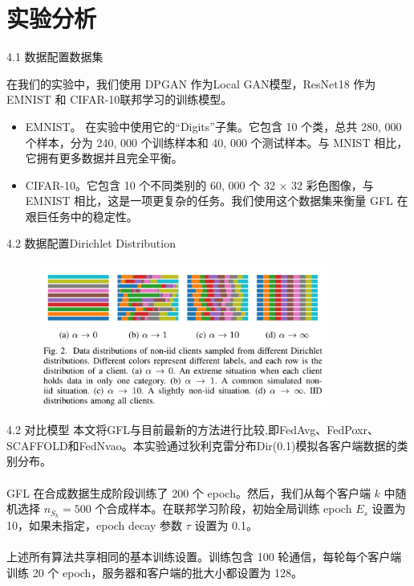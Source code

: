 \documentclass{sintefbeamer}
\theoremstyle{definition}
\begin{document}
\section{实验分析}

\begin{frame}{4.1 数据配置}{数据集}

在我们的实验中，我们使用 DPGAN 作为Local GAN模型，ResNet18 作为 EMNIST 和 CIFAR-10联邦学习的训练模型。

	\begin{itemize}
\item[1)] EMNIST。 在实验中使用它的“Digits”子集。它包含 10 个类，总共 280, 000 个样本，分为 240, 000 个训练样本和 40, 000 个测试样本。与 MNIST 相比，它拥有更多数据并且完全平衡。
\item[2)] CIFAR-10。它包含 10 个不同类别的 60, 000 个 32 × 32 彩色图像，与 EMNIST 相比，这是一项更复杂的任务。我们使用这个数据集来衡量 GFL 在艰巨任务中的稳定性。
\end{itemize}
\end{frame}

\begin{frame}{4.2 数据配置}{Dirichlet Distribution}
\begin{figure}[ht]
\centering
\includegraphics[width=0.85\textwidth]{images/dir}
\end{figure}
\end{frame}


\begin{frame}{4.2 对比模型}
本文将GFL与目前最新的方法进行比较,即FedAvg、FedPoxr、SCAFFOLD和FedNvao。本实验通过狄利克雷分布Dir(0.1)模拟各客户端数据的类别分布。
	\\ \hspace*{\fill} \\
GFL 在合成数据生成阶段训练了 200 个 epoch。然后，我们从每个客户端 $k$ 中随机选择 $n_{S_k}=500$  个合成样本。在联邦学习阶段，初始全局训练 epoch $E_s$ 设置为 10，如果未指定，epoch decay 参数 $\tau$ 设置为 0.1。
	\\ \hspace*{\fill} \\
上述所有算法共享相同的基本训练设置。训练包含 100 轮通信，每轮每个客户端训练 20 个 epoch，服务器和客户端的批大小都设置为 128。
\end{frame}
\end{document}
